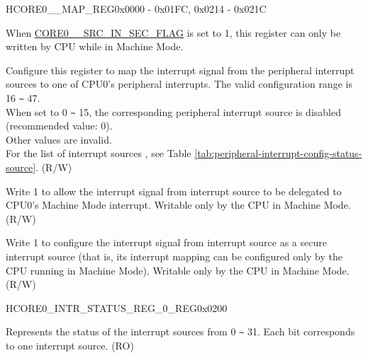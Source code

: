 \begin{register}{H}{CORE0\_\_MAP\_REG}{0x0000 - 0x01FC, 0x0214 - 0x021C}\label{regdesc:CORE0SOURCEMAPREG}
%
%
%
%
\regnewline%
\begin{regdesc}\begin{reglist}
\label{fielddesc:CORE0SOURCEMAP}
\item [CORE0\_\regindex{SOURCE}\_MAP]
When \hyperref[fielddesc:CORE0SOURCESRCINSECFLAG]{CORE0\_\_SRC\_IN\_SEC\_FLAG} is set to 1, this register can only be written by CPU while in Machine Mode.

Configure this register to map the interrupt signal from the peripheral interrupt sources  to one of CPU0’s peripheral interrupts. The valid configuration range is 16 \verb+~+ 47.\\
When set to 0 \verb+~+ 15, the corresponding peripheral interrupt source is disabled (recommended value: 0). \\

Other values are invalid. \\

For the list of interrupt sources , see Table \ref{tab:peripheral-interrupt-config-status-source}.
(R/W)

\label{fielddesc:CORE0SOURCESRCPASSINSEC} \item [CORE0\_\regindex{SOURCE}\_SRC\_PASS\_IN\_SEC] Write 1 to allow the interrupt signal from interrupt source  to be delegated to CPU0’s Machine Mode interrupt. Writable only by the CPU in Machine Mode. (R/W)

\label{fielddesc:CORE0SOURCESRCINSECFLAG}
\item [CORE0\_\regindex{SOURCE}\_SRC\_IN\_SEC\_FLAG] Write 1 to configure the interrupt signal from interrupt source  as a secure interrupt source (that is, its interrupt mapping can be configured only by the CPU running in Machine Mode). Writable only by the CPU in Machine Mode.
(R/W)

\end{reglist}\end{regdesc}
\end{register}


\begin{register}{H}{CORE0\_INTR\_STATUS\_REG\_0\_REG}{0x0200}\label{regdesc:CORE0INTRSTATUSREG0REG}
%
\regnewline%
\begin{regdesc}\begin{reglist}
\label{fielddesc:CORE0INTRSTATUS0}\item [CORE0\_INTR\_STATUS\_0] Represents the status of the interrupt sources from 0 \verb+~+ 31. Each bit corresponds to one interrupt source.  (RO)
\end{reglist}\end{regdesc}
\end{register}


